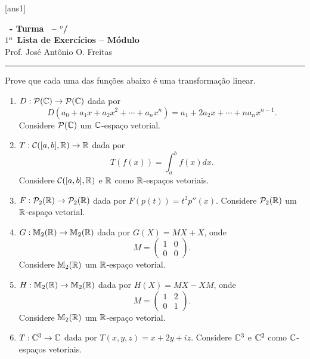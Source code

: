 \documentclass[12pt]{exam}
\begin{document}
  [ans1]
  \begin{center}
    {\Large\bf \disciplina\ - Turma \turma\ -- \semestre$^{o}$/\ano} \\ \vspace{9pt} {\large\bf
        $1^a$ Lista de Exercícios -- Módulo \numeromodulo}\\ \vspace{9pt} Prof. José Antônio O. Freitas
  \end{center}
  \hrule


\begin{exercicio}
  Prove que cada uma das funções abaixo é uma transformação linear.
  \begin{enumerate}[label={\alph*})]
    \item $D : \mathcal{P}(\mathbb{C}) \to \mathcal{P}(\mathbb{C})$ dada por
    \[
        D(a_0 + a_1x + a_2x^2 + \cdots + a_nx^n) = a_1 + 2a_2x + \cdots + na_nx^{n - 1}.
    \]
    Considere $\mathcal{P}(\mathbb{C})$ um $\mathbb{C}$-espaço vetorial.

    \item $T : \mathcal{C}([a,b], \mathbb{R}) \to \mathbb{R}$ dada por
    \[
        T(f(x)) = \int_a^bf(x)dx.
    \]
    Considere $\mathcal{C}([a,b], \mathbb{R})$ e $\mathbb{R}$ como $\mathbb{R}$-espaços vetoriais.

    \item $F : \mathcal{P}_2(\mathbb{R}) \to \mathcal{P}_2(\mathbb{R})$ dada por $F(p(t)) = t^2p''(x)$. Considere $\mathcal{P}_2(\mathbb{R})$ um $\mathbb{R}$-espaço vetorial.

    \item $G : \mathbb{M}_2(\mathbb{R}) \to \mathbb{M}_2(\mathbb{R})$ dada por $G(X) = MX + X$, onde
    \[
        M = \begin{pmatrix}
                1 & 0\\
                0 & 0
            \end{pmatrix}.
    \]
    Considere $\mathbb{M}_2(\mathbb{R})$ um $\mathbb{R}$-espaço vetorial.

    \item $H : \mathbb{M}_2(\mathbb{R}) \to \mathbb{M}_2(\mathbb{R})$ dada por $H(X) = MX - XM$, onde
    \[
        M = \begin{pmatrix}
                1 & 2\\
                0 & 1
            \end{pmatrix}.
    \]
    Considere $\mathbb{M}_2(\mathbb{R})$ um $\mathbb{R}$-espaço vetorial.

    \item $T : \mathbb{C}^3 \to \mathbb{C}$ dada por $T(x,y,z) = x + 2y + iz$. Considere $\mathbb{C}^3$ e $\mathbb{C}^2$ como $\mathbb{C}$-espaços vetoriais.


\end{enumerate}
\end{exercicio}
\end{document}
